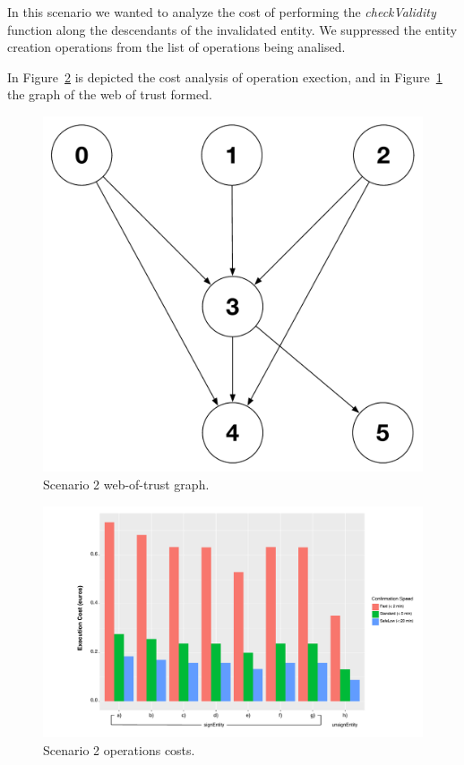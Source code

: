 In this scenario we wanted to analyze the cost of performing the \textit{checkValidity} function along the descendants of the invalidated entity.
We suppressed the entity creation operations from the list of operations being analised.

In Figure~\ref{fig:scenario2-operation-cost} is depicted the cost analysis of operation exection, and in Figure~\ref{fig:scenario2-wot-graph} the graph of the web of trust formed.

\begin{figure}[htb]
  \centering
  \includegraphics[scale=0.5]{Figures/evaluation/wot-scenario2-graph.pdf}
  \caption{Scenario 2 web-of-trust graph.}
\label{fig:scenario2-wot-graph}
\end{figure}

\begin{figure}[htb]
  \centering
  \includegraphics[scale=0.5]{Figures/evaluation/wot-scenario2.pdf}
  \caption{Scenario 2 operations costs.}
\label{fig:scenario2-operation-cost}
\end{figure}

